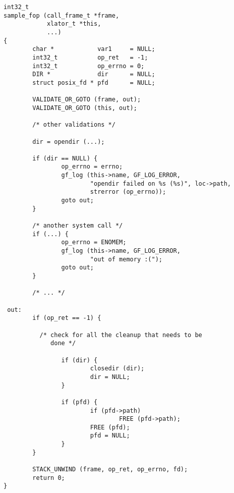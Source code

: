 \documentclass{article}[12pt]
\begin{document}
\begin{verbatim}
int32_t 
sample_fop (call_frame_t *frame,
            xlator_t *this,
            ...)
{
        char *            var1     = NULL;
        int32_t           op_ret   = -1;
        int32_t           op_errno = 0;
        DIR *             dir      = NULL;
        struct posix_fd * pfd      = NULL;

        VALIDATE_OR_GOTO (frame, out);
        VALIDATE_OR_GOTO (this, out);

        /* other validations */
        
        dir = opendir (...);

        if (dir == NULL) {
                op_errno = errno;
                gf_log (this->name, GF_LOG_ERROR, 
                        "opendir failed on %s (%s)", loc->path, 
                        strerror (op_errno));
                goto out;
        }

        /* another system call */
        if (...) {
                op_errno = ENOMEM;
                gf_log (this->name, GF_LOG_ERROR,
                        "out of memory :(");
                goto out;
        }

        /* ... */

 out:
        if (op_ret == -1) {

          /* check for all the cleanup that needs to be
             done */

                if (dir) {
                        closedir (dir);
                        dir = NULL;
                }     
        
                if (pfd) {
                        if (pfd->path)
                                FREE (pfd->path);
                        FREE (pfd);
                        pfd = NULL;
                }
        }

        STACK_UNWIND (frame, op_ret, op_errno, fd);
        return 0;
}
\end{verbatim}
\end{document}
